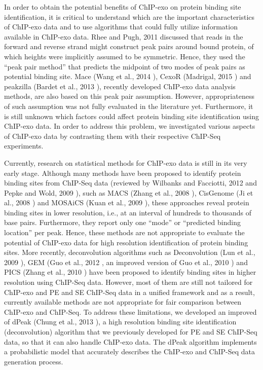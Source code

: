 \documentclass[11pt]{article}\usepackage[]{graphicx}\usepackage[]{color}
\begin{document}
In order to obtain the potential benefits of ChIP-exo on protein
binding site identification, it is critical to understand which are
the important characteristics of ChIP-exo data and to use algorithms
that could fully utilize information available in ChIP-exo data. Rhee
and Pugh, 2011 \cite{exo1} discussed that reads in the forward and
reverse strand might construct peak pairs around bound protein, of
which heights were implicitly assumed to be symmetric. Hence, they
used the ``peak pair method'' that predicts the midpoint of two modes
of peak pairs as potential binding site. Mace (Wang et al., 2014
\cite{mace}), CexoR (Madrigal, 2015 \cite{cexor}) and peakzilla
(Bardet et al., 2013 \cite{peakzilla}), recently developed ChIP-exo
data analysis methods, are also based on this peak pair
assumption. However, appropriateness of such assumption was not fully
evaluated in the literature yet.  Furthermore, it is still unknown
which factors could affect protein binding site identification using
ChIP-exo data. In order to address this problem, we investigated
various aspects of ChIP-exo data by contrasting them with their
respective ChIP-Seq experiments.

Currently, research on statistical methods for ChIP-exo data is still
in its very early stage. Although many methods have been proposed to
identify protein binding sites from ChIP-Seq data (reviewed by
Wilbanks and Facciotti, 2012 \cite{evaluation} and Pepke and Wold,
2009 \cite{computation}), such as MACS (Zhang et al., 2008
\cite{macs}), CisGenome (Ji et al., 2008 \cite{cisgenome}) and
MOSAiCS (Kuan et al., 2009 \cite{mosaics}), these approaches reveal
protein binding sites in lower resolution, i.e., at an interval of
hundreds to thousands of base pairs. Furthermore, they report only one
``mode'' or ``predicted binding location'' per peak. Hence, these
methods are not appropriate to evaluate the potential of ChIP-exo data
for high resolution identification of protein binding sites. More
recently, deconvolution algorithms such as Deconvolution (Lun et al.,
2009 \cite{csdeconv}), GEM (Guo et al., 2012 \cite{gem}, an improved
version of Guo et al., 2010 \cite{gps} ) and PICS (Zhang et al., 2010
\cite{pics}) have been proposed to identify binding sites in higher
resolution using ChIP-Seq data. However, most of them are still not
tailored for ChIP-exo and PE and SE ChIP-Seq data in a unified
framework and as a result, currently available methods are not
appropriate for fair comparison between ChIP-exo and ChIP-Seq. To
address these limitations, we developed an improved of dPeak (Chung et
al., 2013 \cite{dpeak}), a high resolution binding site identification
(deconvolution) algorithm that we previously developed for PE and SE
ChIP-Seq data, so that it can also handle ChIP-exo data. The dPeak
algorithm implements a probabilistic model that accurately describes
the ChIP-exo and ChIP-Seq data generation process.
\end{document}
